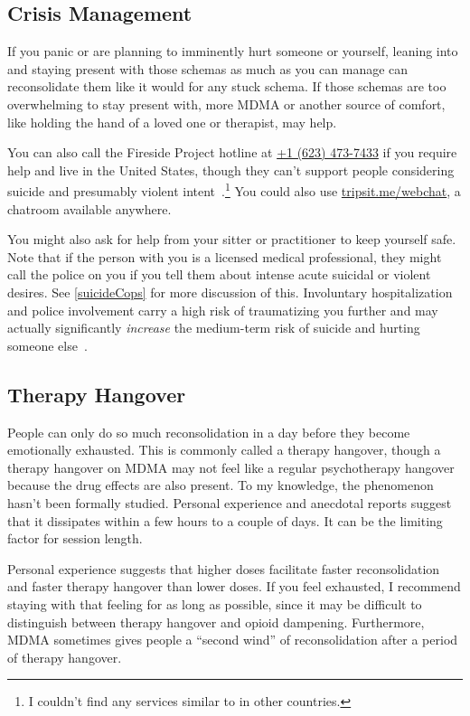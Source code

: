 \documentclass[11pt,oneside]{book}
\let\cite\parencite
\begin{document}
\subsection*{Crisis Management}
If you panic or are planning to imminently hurt someone or yourself, leaning into and staying present with those schemas as much as you can manage can reconsolidate them like it would for any stuck schema. If those schemas are too overwhelming to stay present with, more MDMA or another source of comfort, like holding the hand of a loved one or therapist, may help.

You can also call the Fireside Project hotline at \href{tel:1-623-473-7433}{+1 (623) 473-7433} if you require help and live in the United States, though they can't support people considering suicide and presumably violent intent~\cite{firesideProject}.\footnote{I couldn't find any services similar to \cite{firesideProject} in other countries.} You could also use \href{https://tripsit.me/webchat}{tripsit.me/webchat}, a chatroom available anywhere.

You might also ask for help from your sitter or practitioner to keep yourself safe. Note that if the person with you is a licensed medical professional, they might call the police on you if you tell them about intense acute suicidal or violent desires. See \cref{suicideCops} for more discussion of this. Involuntary hospitalization and police involvement carry a high risk of traumatizing you further and may actually significantly \textit{increase} the medium-term risk of suicide and hurting someone else~\cite{emanuelHospitalization}.

\subsection*{Therapy Hangover}
People can only do so much reconsolidation in a day before they become emotionally exhausted. This is commonly called a therapy hangover, though a therapy hangover on MDMA may not feel like a regular psychotherapy hangover because the drug effects are also present. To my knowledge, the phenomenon hasn't been formally studied. Personal experience and anecdotal reports suggest that it dissipates within a few hours to a couple of days. It can be the limiting factor for session length.

Personal experience suggests that higher doses facilitate faster reconsolidation and faster therapy hangover than lower doses. If you feel exhausted, I recommend staying with that feeling for as long as possible, since it may be difficult to distinguish between therapy hangover and opioid dampening. Furthermore, MDMA sometimes gives people a \enquote{second wind} of reconsolidation after a period of therapy hangover.
\end{document}
